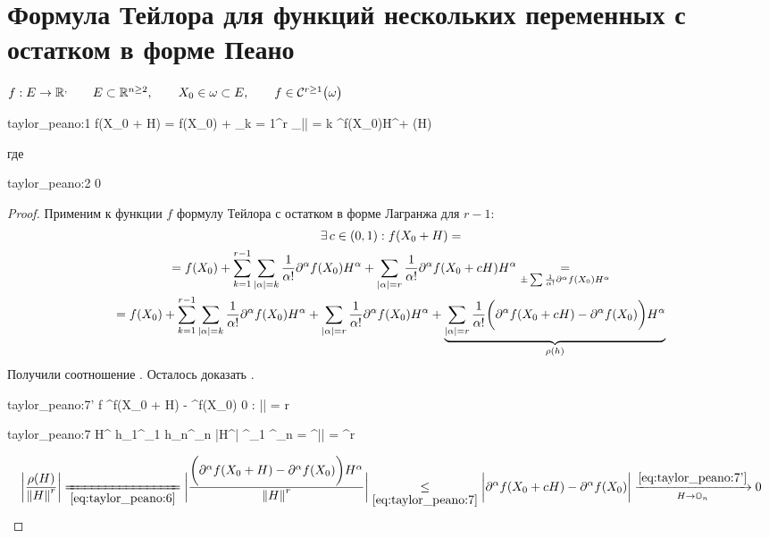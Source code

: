 \section{Формула Тейлора для функций нескольких переменных с остатком в форме Пеано}

\begin{theorem}
	$ f : E \to \R^, \qquad E \sub \R^{n \ge 2}, \qquad X_0 \in \omega \sub E, \qquad f \in \Cont[r \ge 1]{\omega} $
	\begin{equ}{taylor_peano:1}
		\implies f(X_0 + H) = f(X_0) + \sum_{k = 1}^r \sum_{|\alpha| = k}  \partial^\alpha f(X_0)H^\alpha + \rho(H)
	\end{equ}
	где
	\begin{equ}{taylor_peano:2}
		  0
	\end{equ}
\end{theorem}

\begin{proof}
	Применим к функции $ f $ формулу Тейлора с остатком в форме Лагранжа для $ r - 1 $:
	\begin{multline}\lbl{taylor_peano:6}
		\exist c \in (0, 1) : f(X_0 + H) = \\
		= f(X_0) + \sum_{k = 1}^{r - 1} \sum_{|\alpha| = k} \frac1{\alpha!} \partial^\alpha f(X_0)H^\alpha + \sum_{|\alpha| = r} \frac1{\alpha!} \partial^\alpha f(X_0 + cH)H^\alpha \underset{\pm \sum \frac1{\alpha!} \partial^\alpha f(X_0)H^\alpha}= \\
		= f(X_0) + \sum_{k = 1}^{r - 1} \sum_{|\alpha| = k} \frac1{\alpha!} \partial^\alpha f(X_0) H^\alpha + \sum_{|\alpha| = r} \frac1{\alpha!} \partial^\alpha f(X_0) H^\alpha + \underbrace{\sum_{|\alpha| = r} \frac1{\alpha!} \bigg( \partial^\alpha f(X_0 + cH) - \partial^\alpha f(X_0) \bigg)H^\alpha}_{\rho(h)}
	\end{multline}
	Получили соотношение . Осталось доказать .
	\begin{equ}{taylor_peano:7'}
		f \in \Cont[r]\omega {} \partial^\alpha f(X_0 + H) - \partial^\alpha f(X_0)  0 \qquad \forall \alpha : |\alpha| = r
	\end{equ}
	\begin{equ}{taylor_peano:7}
		H^\alpha {} h_1^{\alpha_1} \cdots h_n^{\alpha_n} \implies |H^\alpha| \le {}^{\alpha_1} \cdots {}^{\alpha_n} = ^{|\alpha|} = ^r \implies {} 
	\end{equ}
	$$ \bigg| \frac{\rho(H)}{\norm{H}^r} \bigg| \undereq{\eref{taylor_peano:6}} \bigg| \frac{\bigg( \partial^\alpha f(X_0 + H) - \partial^\alpha f(X_0) \bigg)H^\alpha}{\norm{H}^r} \bigg| \underset{\eref{taylor_peano:7}}\le \bigg| \partial^\alpha f(X_0 + cH) - \partial^\alpha f(X_0) \bigg| \xrightarrow[H \to \On]{\eref{taylor_peano:7'}} 0 $$
\end{proof}

